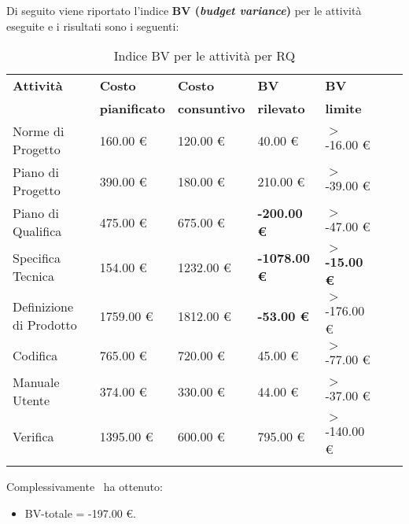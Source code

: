 Di seguito viene riportato l'indice \textbf{BV (\textit{budget variance})} per le attività eseguite e i risultati sono i seguenti:
\begin{longtable}{lllllXr}
\toprule
\textbf{Attività} & \textbf{Costo} & \textbf{Costo} & \textbf{BV} & \textbf{BV} \\
& \textbf{pianificato} & \textbf{consuntivo} & \textbf{rilevato} & \textbf{limite}\\
\toprule
Norme di Progetto & 160.00 € & 120.00 € & 40.00 € & $>$ -16.00 €\\
\midrule
Piano di Progetto & 390.00 € & 180.00 € & 210.00 € & $>$ -39.00 €\\
\midrule
Piano di Qualifica & 475.00 € & 675.00 € & \textbf{-200.00 €} & $>$ -47.00 €\\
\midrule
Specifica Tecnica & 154.00 € & 1232.00 € & \textbf{-1078.00 €} & \textbf{$>$ -15.00 €}\\
\midrule
Definizione di Prodotto & 1759.00 € & 1812.00 € & \textbf{-53.00 €} & $>$ -176.00 €\\
\midrule
Codifica & 765.00 € & 720.00 € & 45.00 € & $>$ -77.00 €\\
\midrule
Manuale Utente & 374.00 € & 330.00 € & 44.00 € & $>$ -37.00 €\\
\midrule
Verifica & 1395.00 € & 600.00 € & 795.00 € & $>$ -140.00 €\\
\bottomrule
\caption{Indice BV per le attività per RQ}
\end{longtable}
Complessivamente \gruppo ~ha ottenuto:
\begin{itemize}
\item BV-totale = -197.00 €.
\end{itemize}
